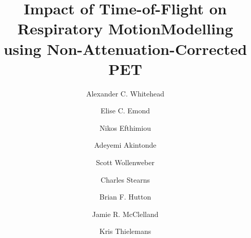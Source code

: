 \documentclass[portrait,color=UCLburgundy,margin=2cm]{uclposter}
\begin{document}
\title{Impact of Time-of-Flight on Respiratory Motion\newline Modelling using Non-Attenuation-Corrected PET}

\author[1,2 *]{Alexander C. Whitehead}
\author[1]{Elise C. Emond}
\author[3]{Nikos Efthimiou}
\author[1,2]{Adeyemi Akintonde}
\author[4]{Scott Wollenweber}
\author[4]{\newline Charles Stearns}
\author[1]{Brian F. Hutton}
\author[2]{Jamie R. McClelland}
\author[1]{Kris Thielemans}


\maketitle

\vspace{-1.0cm}
\end{document}
